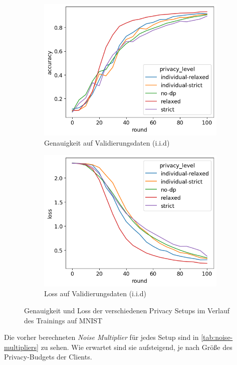 \begin{figure}[h]
\begin{subfigure}{0.45\textwidth}
		\includegraphics[width=\textwidth]{Bilder/emnist-accuracy-iid.png}
		\caption{Genauigkeit auf Validierungsdaten (i.i.d)}
	\end{subfigure}
	\begin{subfigure}{0.45\textwidth}
		\centering
		\includegraphics[width=\textwidth]{Bilder/emnist-loss-iid.png}
		\caption{Loss auf Validierungsdaten (i.i.d)}
	\end{subfigure}
	\caption{Genauigkeit und Loss der verschiedenen Privacy Setups im Verlauf des Trainings auf MNIST}
	\label{fig:fed-emnist-results}
\end{figure}

Die vorher berechneten \textit{Noise Multiplier} für jedes Setup sind in \autoref{tab:noise-multipliers} zu sehen. Wie erwartet sind sie aufsteigend, je nach Größe des Privacy-Budgets der Clients.

